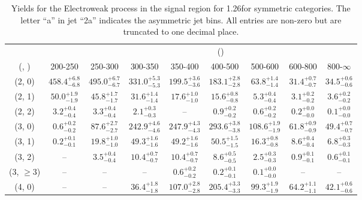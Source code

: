 \begin{table}[h!]
\tiny
\centering
\caption{Yields for the Electroweak process in the signal region for 1.26\ifb for symmetric categories. The letter ``a'' in jet \eg ``2a''  indicates the asymmetric jet bins. All entries are non-zero but are truncated to one decimal place.\label{tab:yieldssep_ewk_sig_sym}}
\begin{tabular}
{ccccccccc}
	\hline\hline
&	& \multicolumn{8}{c}{\scalht (\gev)} \\ 
	 (\njet,  \nb) & 200-250 & 250-300 & 300-350 & 350-400 & 400-500 & 500-600 & 600-800 & 800-$\infty$ \\ [0.8ex] 
\hline
	(2, 0) & $458.4^{+ 6.8 }_{- 6.8 }$ & $495.0^{+ 6.7 }_{- 6.7 }$ & $331.0^{+ 5.3 }_{- 5.3 }$ & $199.5^{+ 3.6 }_{- 3.6 }$ & $183.1^{+ 2.8 }_{- 2.8 }$ & $63.8^{+ 1.4 }_{- 1.4 }$ & $31.4^{+ 0.7 }_{- 0.7 }$ & $34.5^{+ 0.6 }_{- 0.6 }$ \\[0.5ex] 
	(2, 1) & $50.0^{+ 1.9 }_{- 1.9 }$ & $45.8^{+ 1.7 }_{- 1.7 }$ & $31.6^{+ 1.4 }_{- 1.4 }$ & $17.6^{+ 1.0 }_{- 1.0 }$ & $15.6^{+ 0.8 }_{- 0.8 }$ & $5.3^{+ 0.4 }_{- 0.4 }$ & $3.1^{+ 0.2 }_{- 0.2 }$ & $3.6^{+ 0.2 }_{- 0.2 }$ \\[0.5ex] 
	(2, 2) & $3.2^{+ 0.4 }_{- 0.4 }$ & $3.3^{+ 0.4 }_{- 0.4 }$ & $2.1^{+ 0.3 }_{- 0.3 }$ & -- & $0.9^{+ 0.2 }_{- 0.2 }$ & $0.6^{+ 0.2 }_{- 0.2 }$ & $0.2^{+ 0.0 }_{- 0.0 }$ & $0.1^{+ 0.0 }_{- 0.0 }$ \\[0.5ex] 
	(3, 0) & $0.6^{+ 0.2 }_{- 0.2 }$ & $87.6^{+ 2.7 }_{- 2.7 }$ & $242.9^{+ 4.6 }_{- 4.6 }$ & $247.9^{+ 4.3 }_{- 4.3 }$ & $293.6^{+ 3.8 }_{- 3.8 }$ & $108.6^{+ 1.9 }_{- 1.9 }$ & $61.8^{+ 0.9 }_{- 0.9 }$ & $49.4^{+ 0.7 }_{- 0.7 }$ \\[0.5ex] 
	(3, 1) & $0.2^{+ 0.1 }_{- 0.1 }$ & $19.8^{+ 1.0 }_{- 1.0 }$ & $49.3^{+ 1.6 }_{- 1.6 }$ & $49.2^{+ 1.6 }_{- 1.6 }$ & $50.5^{+ 1.5 }_{- 1.5 }$ & $16.3^{+ 0.8 }_{- 0.8 }$ & $8.6^{+ 0.4 }_{- 0.4 }$ & $6.8^{+ 0.3 }_{- 0.3 }$ \\[0.5ex] 
	(3, 2) & -- & $3.5^{+ 0.4 }_{- 0.4 }$ & $10.4^{+ 0.7 }_{- 0.7 }$ & $10.4^{+ 0.7 }_{- 0.7 }$ & $8.6^{+ 0.5 }_{- 0.5 }$ & $2.5^{+ 0.3 }_{- 0.3 }$ & $0.9^{+ 0.1 }_{- 0.1 }$ & $0.6^{+ 0.1 }_{- 0.1 }$ \\[0.5ex] 
	(3, $\ge3$) & -- & -- & -- & $0.6^{+ 0.2 }_{- 0.2 }$ & $0.2^{+ 0.1 }_{- 0.1 }$ & $0.1^{+ 0.0 }_{- 0.0 }$ & -- & -- \\[0.5ex] 
	(4, 0) & -- & -- & $36.4^{+ 1.8 }_{- 1.8 }$ & $107.0^{+ 2.8 }_{- 2.8 }$ & $205.4^{+ 3.3 }_{- 3.3 }$ & $99.3^{+ 1.9 }_{- 1.9 }$ & $64.2^{+ 1.1 }_{- 1.1 }$ & $42.1^{+ 0.6 }_{- 0.6 }$ \\[0.5ex] 

\end{tabular}
\end{table}
